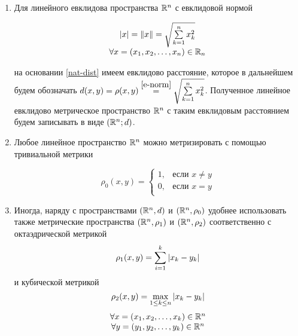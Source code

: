 \documentclass[../../main.tex]{subfiles}
\begin{document}
\begin{rems} 

 \quad

 \begin{enumerate}
  \item  Для линейного евклидова пространства $\mathbb{R}^n$ с евклидовой
  нормой
  
  \begin{equation}
   \label{e-norm}
   \begin{array}{c}
    \left|{x}\right| = \lVert{x}\rVert = \sqrt{\sum\limits_{k=1}^n x_k^2} \\
    \forall x = (x_1, x_2, \dots, x_n) \in \mathbb{R}_n
   \end{array}
  \end{equation}
  
  на основании \eqref{nat-dist} имеем евклидово расстояние, которое
  в дальнейшем будем обозначать $d(x, y) = \rho(x, y) \stk{e-norm}{=}
  \sqrt{\sum\limits_{k=1}^n x_k^2}$. Полученное линейное евклидово 
  метрическое пространство $\mathbb{R}^n$ с таким евклидовым расстоянием 
  будем записывать в виде $(\mathbb{R}^n; d)$.
  
  \item Любое линейное пространство $\mathbb{R}^n$ можно метризировать с
  помощью тривиальной метрики
  
  \[
   \rho_0(x, y) =
   \begin{cases}
    1, & \text{если } x \ne y \\
    0, & \text{если } x = y \\
   \end{cases}
  \]
  
  \item Иногда, наряду с пространствами $(\mathbb{R}^n, d)$ и $(\mathbb{R}^n, \rho_0)$
  удобнее использовать также метрические пространства $(\mathbb{R}^n, \rho_1)$
  и $(\mathbb{R}^n, \rho_2)$ соответственно с октаэдрической метрикой
  \[\rho_1(x, y) = \sum_{i=1}^k \left|{x_k - y_k}\right|\]
  и кубической метрикой
  \[\rho_2(x, y) = \max_{1 \le k \le n} \left|{x_k - y_k}\right|\]
  \[\begin{array}{c}
     \forall x = (x_1, x_2, \dots, x_k) \in \mathbb{R}^n \\
     \forall y = (y_1, y_2, \dots, y_k) \in \mathbb{R}^n \\
    \end{array}\]
 \end{enumerate}

\end{rems}
\end{document}
